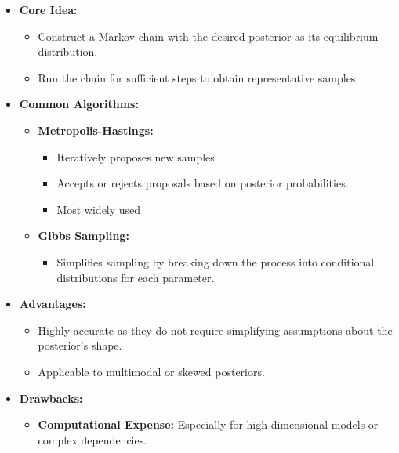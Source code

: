 \begin{itemize}
    \item \textbf{Core Idea:}
          \begin{itemize}
              \item Construct a Markov chain with the desired posterior as its equilibrium distribution.
              \item Run the chain for sufficient steps to obtain representative samples.
          \end{itemize}
    \item \textbf{Common Algorithms:}
          \begin{itemize}
              \item \textbf{Metropolis-Hastings:}
                    \begin{itemize}
                        \item Iteratively proposes new samples.
                        \item Accepts or rejects proposals based on posterior probabilities.
                        \item Most widely used
                    \end{itemize}
              \item \textbf{Gibbs Sampling:}
                    \begin{itemize}
                        \item Simplifies sampling by breaking down the process into conditional distributions for each parameter.
                    \end{itemize}
          \end{itemize}
    \item \textbf{Advantages:}
          \begin{itemize}
              \item Highly accurate as they do not require simplifying assumptions about the posterior's shape.
              \item Applicable to multimodal or skewed posteriors.
          \end{itemize}
    \item \textbf{Drawbacks:}
          \begin{itemize}
              \item \textbf{Computational Expense:} Especially for high-dimensional models or complex dependencies.
          \end{itemize}
\end{itemize}

